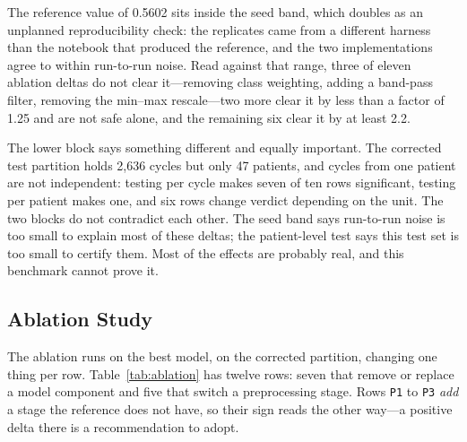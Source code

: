 \documentclass[journal,onecolumn]{IEEEtran}
\begin{document}
The reference value of 0.5602 sits inside the seed band, which doubles as an unplanned
reproducibility check: the replicates came from a different harness than the notebook that
produced the reference, and the two implementations agree to within run-to-run noise. Read
against that range, three of eleven ablation deltas do not clear it---removing class weighting,
adding a band-pass filter, removing the min--max rescale---two more clear it by less than a
factor of 1.25 and are not safe alone, and the remaining six clear it by at least 2.2.

The lower block says something different and equally important. The corrected test partition
holds 2,636 cycles but only 47 patients, and cycles from one patient are not independent:
testing per cycle makes seven of ten rows significant, testing per patient makes one, and six
rows change verdict depending on the unit. The two blocks do not contradict each other. The
seed band says run-to-run noise is too small to explain most of these deltas; the patient-level
test says this test set is too small to certify them. Most of the effects are probably real,
and this benchmark cannot prove it.

\subsection{Ablation Study}
\label{subsec:ablation}

The ablation runs on the best model, on the corrected partition, changing one thing per row.
Table~\ref{tab:ablation} has twelve rows: seven that remove or replace a model component and
five that switch a preprocessing stage. Rows \texttt{P1} to \texttt{P3} \emph{add} a stage the
reference does not have, so their sign reads the other way---a positive delta there is a
recommendation to adopt.
\end{document}
